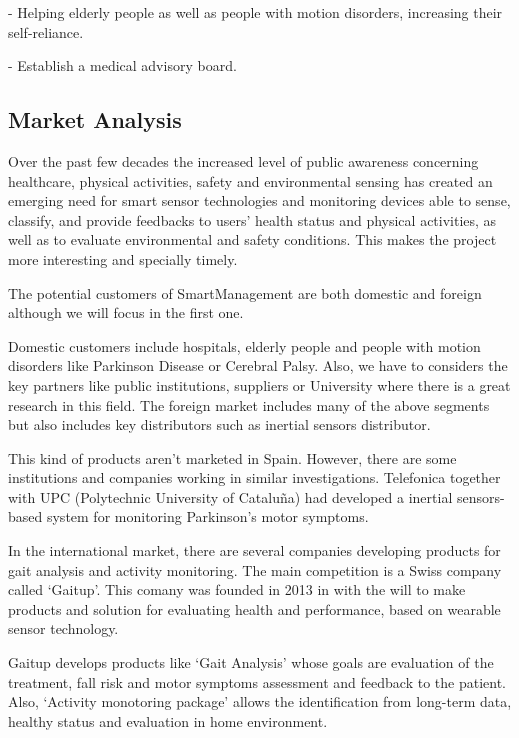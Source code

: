 -	Helping elderly people as well as people with motion disorders, increasing their self-reliance.

-	Establish a medical advisory board.

\vfill

\subsection{Market Analysis}
 Over the past few decades the increased level of public awareness concerning healthcare, physical activities, safety and environmental sensing has created an emerging need for smart sensor technologies and monitoring devices able to sense, classify, and provide feedbacks to users’ health status and physical activities, as well as to evaluate environmental and safety conditions. This makes the project more interesting and specially timely.
 
 The potential customers of SmartManagement are both domestic and foreign although we will focus in the first one.
 
 Domestic customers include hospitals, elderly people and people with motion disorders like Parkinson Disease or Cerebral Palsy. Also, we have to considers the key partners like public institutions, suppliers or University where there is a great research in this field.
  The foreign market includes many of the above segments but also includes key distributors such as inertial sensors distributor.
 
 This kind of products aren’t marketed in Spain. However, there are some institutions and companies working in similar investigations. Telefonica  together with UPC (Polytechnic University of Cataluña) had developed a inertial sensors-based system for monitoring Parkinson's motor symptoms\cite{rempark}.
 
 In the international market, there are several companies developing products for gait analysis and activity monitoring. The main competition is a Swiss company called ‘Gaitup’\cite{gaitup}. This comany was founded in 2013 in with the will to make products and solution for evaluating health and performance, based on wearable sensor technology.
 
 Gaitup develops products like ‘Gait Analysis’ whose goals are evaluation of the treatment, fall risk and motor symptoms assessment and feedback to the patient. Also, ‘Activity monotoring package’ allows the identification from long-term data, healthy status and  evaluation in home environment.
 

